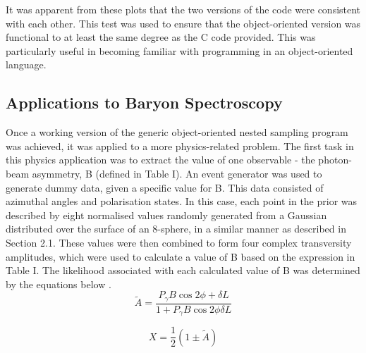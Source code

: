 \documentclass[a4paper,12pt]{article}
\begin{document}
It was apparent from these plots that the two versions of the code were consistent with each other.  This test was used to ensure that the object-oriented version was functional to at least the same degree as the C code provided.  This was particularly useful in becoming familiar with programming in an object-oriented language.

\newpage
 
\subsection{Applications to Baryon Spectroscopy}

Once a working version of the generic object-oriented nested sampling program was achieved, it was applied to a more physics-related problem.  The first task in this physics application was to extract the value of one observable - the photon-beam asymmetry, B (defined in Table I). An event generator was used to generate dummy data, given a specific value for B.  This data consisted of azimuthal angles and polarisation states.
\newline
In this case, each point in the prior was described by eight normalised values randomly generated from a Gaussian distributed over the surface of an 8-sphere, in a similar manner as described in Section 2.1. %
These values were then combined to form four complex transversity amplitudes, which were used to calculate a value of B based on the expression in Table I.  The likelihood associated with each calculated value of B was determined by the equations below \cite{dgi}.
\begin{equation}
 \tilde{A} = \frac{P_{\gamma}B\cos2\phi + \delta L}{1 + P_{\gamma}B\cos2\phi \delta L}
\end{equation}


\begin{equation}
X = \frac{1}{2}(1 \pm \tilde{A})
\end{equation}
\end{document}
